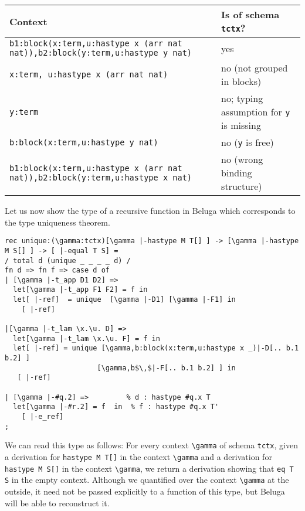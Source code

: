 \begin{small}
\begin{center}
\begin{tabular}{p{8.65cm}@{}|@{~}p{6.25cm}}
\hspace{2cm}Context & \hspace{1.5cm}Is of schema \lstinline!tctx!?\\
\hline
\lstinline!b1:block(x:term,u:hastype x (arr nat nat)),!\newline\lstinline!b2:block(y:term,u:hastype y nat)!
& yes \\ \hline
\lstinline!x:term, u:hastype x (arr nat nat)! & no (not grouped in blocks)
\\\hline
\lstinline!y:term! & no; typing assumption for \lstinline!y! is missing\\\hline
\lstinline!b:block(x:term,u:hastype y nat)! & no (\lstinline!y! is free) \\
\hline
\lstinline!b1:block(x:term,u:hastype x (arr nat nat)),!\newline\lstinline!b2:block(y:term,u:hastype x nat)!
& no (wrong binding structure)
\end{tabular}
\end{center}  
\end{small}


Let us now show the type of a recursive function in Beluga which
corresponds to the type uniqueness theorem.


\begin{lstlisting}[caption={Type Uniqueness Proof},label=list:8-6,captionpos=b,float,abovecaptionskip=-\medskipamount]
rec unique:(\gamma:tctx)[\gamma |-hastype M T[] ] -> [\gamma |-hastype M S[] ] -> [ |-equal T S] =
/ total d (unique _ _ _ _ d) /
fn d => fn f => case d of
| [\gamma |-t_app D1 D2] =>
  let[\gamma |-t_app F1 F2] = f in
  let[ |-ref]  = unique  [\gamma |-D1] [\gamma |-F1] in
    [ |-ref]

|[\gamma |-t_lam \x.\u. D] =>
  let[\gamma |-t_lam \x.\u. F] = f in
  let[ |-ref] = unique [\gamma,b:block(x:term,u:hastype x _)|-D[.. b.1 b.2] ] 
                      [\gamma,b$\,$|-F[.. b.1 b.2] ] in
   [ |-ref]

| [\gamma |-#q.2] =>         % d : hastype #q.x T
  let[\gamma |-#r.2] = f  in  % f : hastype #q.x T'
    [ |-e_ref]
;
\end{lstlisting}


We can read this type as follows: For every context \lstinline!\gamma! of
schema \lstinline!tctx!, given a derivation for
\lstinline!hastype M T[]! in the context \lstinline!\gamma! and a derivation for
\lstinline!hastype M S[]! in the context \lstinline!\gamma!, we return a
derivation showing that \lstinline!eq T S! in the empty context.
Although we quantified over the context \lstinline!\gamma! at the outside,
it need not be passed explicitly to a function of this type, but
Beluga will be able to reconstruct it.

